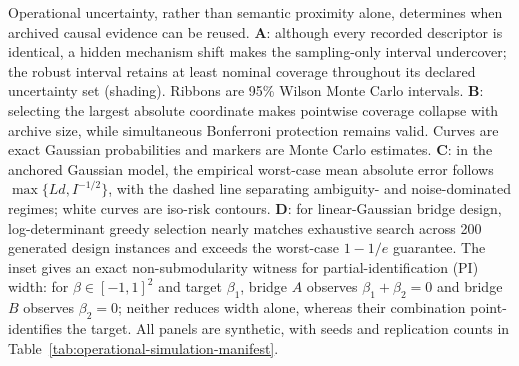 \caption{Operational uncertainty, rather than semantic proximity alone, determines when archived causal evidence can be reused. \textbf{A}: although every recorded descriptor is identical, a hidden mechanism shift makes the sampling-only interval undercover; the robust interval retains at least nominal coverage throughout its declared uncertainty set (shading). Ribbons are 95\% Wilson Monte Carlo intervals. \textbf{B}: selecting the largest absolute coordinate makes pointwise coverage collapse with archive size, while simultaneous Bonferroni protection remains valid. Curves are exact Gaussian probabilities and markers are Monte Carlo estimates. \textbf{C}: in the anchored Gaussian model, the empirical worst-case mean absolute error follows $\max\{Ld,I^{-1/2}\}$, with the dashed line separating ambiguity- and noise-dominated regimes; white curves are iso-risk contours. \textbf{D}: for linear-Gaussian bridge design, log-determinant greedy selection nearly matches exhaustive search across 200 generated design instances and exceeds the worst-case $1-1/e$ guarantee. The inset gives an exact non-submodularity witness for partial-identification (PI) width: for $\beta\in[-1,1]^2$ and target $\beta_1$, bridge $A$ observes $\beta_1+\beta_2=0$ and bridge $B$ observes $\beta_2=0$; neither reduces width alone, whereas their combination point-identifies the target. All panels are synthetic, with seeds and replication counts in Table~\ref{tab:operational-simulation-manifest}.}
